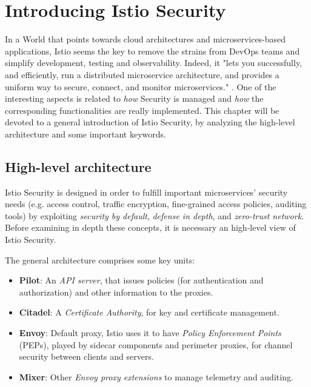 \chapter{Introducing Istio Security}
In a World that points towards cloud architectures and microservices-based applications, Istio seems the key to remove the strains from DevOps teams and simplify development, testing and observability. Indeed, it "lets you successfully, and efficiently, run a distributed microservice architecture, and provides a uniform way to secure, connect, and monitor microservices." \cite{istio}.
One of the interesting aspects is related to \textit{how} Security is managed and \textit{how} the corresponding functionalities are really implemented. This chapter will be devoted to a general introduction of Istio Security, by analyzing the high-level architecture and some important keywords.

\minitoc

\vspace{0.5cm}
\section{High-level architecture}
Istio Security is designed in order to fulfill important microservices' security needs (e.g. access control, traffic encryption, fine-grained access policies, auditing tools) by exploiting \textit{security by default}, \textit{defense in depth}, and \textit{zero-trust network}.
Before examining in depth these concepts, it is necessary an high-level view of  Istio Security.

The general architecture \cite{istiosec} comprises some key units:

\begin{itemize}
    \item \textbf{Pilot}: An \textit{API server}, that issues policies (for authentication and authorization) and other information to the proxies.
    \item \textbf{Citadel}: A \textit{Certificate Authority}, for key and certificate management.
    \item \textbf{Envoy}: Default proxy, Istio uses it to have \textit{Policy Enforcement Points} (PEPs), played by sidecar components and perimeter proxies, for channel security between clients and servers. 
    \item \textbf{Mixer}: Other \textit{Envoy proxy extensions} to manage telemetry and auditing.
\end{itemize}

